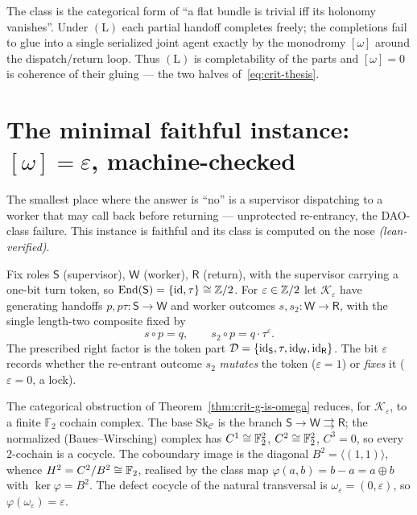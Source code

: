 \begin{remark}
\label{rem:crit-holonomy}
The class is the categorical form of ``a flat bundle is trivial iff its holonomy
vanishes''. Under $(\mathrm{L})$ each partial handoff completes freely; the
completions fail to glue into a single serialized joint agent exactly by the
monodromy $[\omega]$ around the dispatch/return loop. Thus $(\mathrm{L})$ is
completability of the parts and $[\omega]=0$ is coherence of their gluing --- the
two halves of~\eqref{eq:crit-thesis}.
\end{remark}

\section{The minimal faithful instance: $[\omega]=\varepsilon$, machine-checked}
\label{sec:crit-lean}

The smallest place where the answer is ``no'' is a supervisor dispatching to a
worker that may call back before returning --- unprotected re-entrancy, the
DAO-class failure. This instance is faithful and its class is computed on the
nose \emph{(lean-verified)}.

\begin{definition}
\label{def:crit-family}
Fix roles $\mathsf{S}$ (supervisor), $\mathsf{W}$ (worker), $\mathsf{R}$ (return),
with the supervisor carrying a one-bit turn token, so
$\mathrm{End}(\mathsf{S})=\{\mathrm{id},\tau\}\cong\mathbb{Z}/2$. For $\varepsilon\in\mathbb{Z}/2$ let
$\mathcal{K}_\varepsilon$ have generating handoffs $p,p\tau:\mathsf{S}\to\mathsf{W}$
and worker outcomes $s,s_2:\mathsf{W}\to\mathsf{R}$, with the single length-two
composite fixed by
\[
  s\circ p=q,\qquad s_2\circ p=q\cdot\tau^{\varepsilon}.
\]
The prescribed right factor is the token part
$\mathcal{D}=\{\mathrm{id}_{\mathsf{S}},\tau,\mathrm{id}_{\mathsf{W}},\mathrm{id}_{\mathsf{R}}\}$. The bit
$\varepsilon$ records whether the re-entrant outcome $s_2$ \emph{mutates} the token
($\varepsilon=1$) or \emph{fixes} it ($\varepsilon=0$, a lock).
\end{definition}

The categorical obstruction of Theorem~\ref{thm:crit-g-is-omega} reduces, for
$\mathcal{K}_\varepsilon$, to a finite $\mathbb{F}_2$ cochain complex. The base
$\mathrm{Sk}_{\mathcal{C}}$ is the branch
$\mathsf{S}\to\mathsf{W}\rightrightarrows\mathsf{R}$; the normalized
(Baues--Wirsching) complex has $C^1\cong\mathbb{F}_2^2$, $C^2\cong\mathbb{F}_2^2$,
$C^3=0$, so every $2$-cochain is a cocycle. The coboundary image is the diagonal
$B^2=\langle(1,1)\rangle$, whence $H^2=C^2/B^2\cong\mathbb{F}_2$, realised by the
class map $\varphi(a,b)=b-a=a\oplus b$ with $\ker\varphi=B^2$. The defect cocycle
of the natural transversal is $\omega_\varepsilon=(0,\varepsilon)$, so
$\varphi(\omega_\varepsilon)=\varepsilon$.

